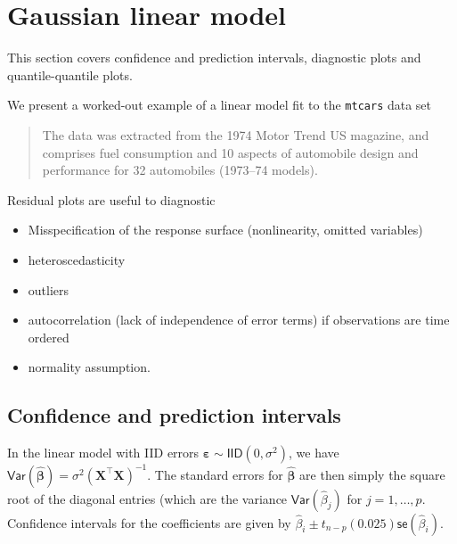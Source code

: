\documentclass[]{book}
\providecommand{\tightlist}{%
  \setlength{\itemsep}{0pt}\setlength{\parskip}{0pt}}
\theoremstyle{definition}
\theoremstyle{definition}
\theoremstyle{definition}
\theoremstyle{remark}
\begin{document}
\hypertarget{gaussian-linear-model}{%
\chapter{Gaussian linear model}\label{gaussian-linear-model}}

This section covers confidence and prediction intervals, diagnostic plots and quantile-quantile plots.

We present a worked-out example of a linear model fit to the \texttt{mtcars} data set

\begin{quote}
The data was extracted from the 1974 Motor Trend US magazine, and comprises fuel consumption and 10 aspects of automobile design and performance for 32 automobiles (1973--74 models).
\end{quote}

Residual plots are useful to diagnostic

\begin{itemize}
\tightlist
\item
  Misspecification of the response surface (nonlinearity, omitted variables)
\item
  heteroscedasticity
\item
  outliers
\item
  autocorrelation (lack of independence of error terms) if observations are time ordered
\item
  normality assumption.
\end{itemize}

\hypertarget{confidence-and-prediction-intervals}{%
\section{Confidence and prediction intervals}\label{confidence-and-prediction-intervals}}

In the linear model with IID errors \(\boldsymbol{\varepsilon}\sim \mathsf{IID}(0, \sigma^2)\), we have \(\mathsf{Var}(\hat{\boldsymbol{\beta}}) = \sigma^2(\mathbf{X}^\top\mathbf{X})^{-1}\). The standard errors for \(\hat{\boldsymbol{\beta}}\) are then simply the square root of the diagonal entries (which are the variance \(\mathsf{Var}(\hat{\beta}_j)\) for \(j=1, \ldots, p\). Confidence intervals for the coefficients are given by \(\hat{\beta}_i \pm t_{n-p}({0.025})\mathsf{se}(\hat{\beta}_i)\).
\end{document}
